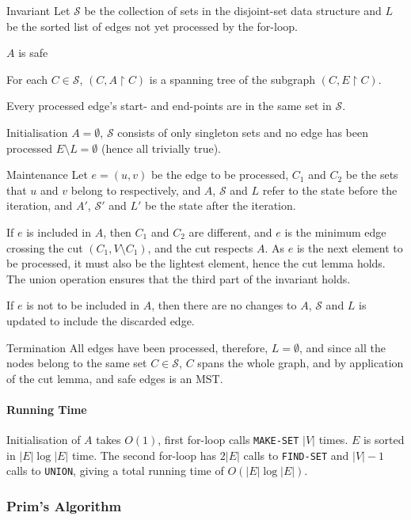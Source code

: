 \documentclass[10pt]{article}
\begin{document}
\begin{description*}
	\item[Invariant]Let $\mathcal S$ be the collection of sets in the disjoint-set data structure and $L$ be the sorted list of edges not yet processed by the for-loop.
		\begin{enumerate*}
			\item$A$ is safe
			\item For each $C\in\mathcal S$, $(C,A\upharpoonright C)$ is a spanning tree of the subgraph $(C,E\upharpoonright C)$.
			\item Every processed edge's start- and end-points are in the same set in $\mathcal S$.
		\end{enumerate*}
	\item[Initialisation]$A=\emptyset$, $\mathcal S$ consists of only singleton sets and no edge has been processed $E\setminus L=\emptyset$ (hence all trivially true).
	\item[Maintenance]Let $e=(u,v)$ be the edge to be processed, $C_1$ and $C_2$ be the sets that $u$ and $v$ belong to respectively, and $A$, $\mathcal S$ and $L$ refer to the state before the iteration, and $A'$, $\mathcal S'$ and $L'$ be the state after the iteration.

		If $e$ is included in $A$, then $C_1$ and $C_2$ are different, and $e$ is the minimum edge crossing the cut $(C_1,V\setminus C_1)$, and the cut respects $A$.  As $e$ is the next element to be processed, it must also be the lightest element, hence the cut lemma holds.  The union operation ensures that the third part of the invariant holds.

		If $e$ is not to be included in $A$, then there are no changes to $A$, $\mathcal S$ and $L$ is updated to include the discarded edge.
	\item[Termination]All edges have been processed, therefore, $L=\emptyset$, and since all the nodes belong to the same set $C\in\mathcal S$, $C$ spans the whole graph, and by application of the cut lemma, and safe edges is an MST.
\end{description*}
\paragraph{Running Time}Initialisation of $A$ takes $O(1)$, first for-loop calls \texttt{MAKE-SET} $|V|$ times. $E$ is sorted in $|E|\log|E|$ time.  The second for-loop has $2|E|$ calls to \texttt{FIND-SET} and $|V|-1$ calls to \texttt{UNION}, giving a total running time of $O(|E|\log|E|)$.
\subsubsection{Prim's Algorithm}
\end{document}
